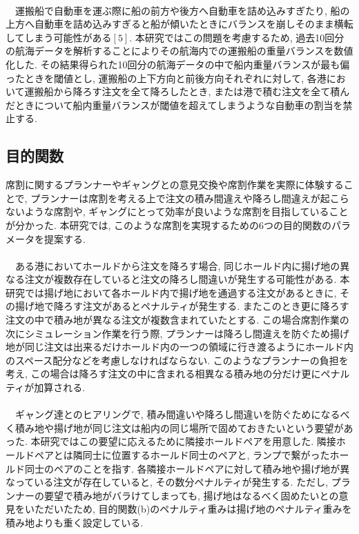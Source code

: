 \documentclass[a4j,11pt,twocolumn]{jsarticle}
\begin{document}
 \\
　運搬船で自動車を運ぶ際に船の前方や後方へ自動車を詰め込みすぎたり, 船の上方へ自動車を詰め込みすぎると船が傾いたときにバランスを崩しそのまま横転してしまう可能性がある$[5]$. 本研究ではこの問題を考慮するため, 過去10回分の航海データを解析することによりその航海内での運搬船の重量バランスを数値化した. その結果得られた10回分の航海データの中で船内重量バランスが最も偏ったときを閾値とし, 運搬船の上下方向と前後方向それぞれに対して, 各港において運搬船から降ろす注文を全て降ろしたとき, または港で積む注文を全て積んだときについて船内重量バランスが閾値を超えてしまうような自動車の割当を禁止する.

\subsection{目的関数}
席割に関するプランナーやギャングとの意見交換や席割作業を実際に体験することで, プランナーは席割を考える上で注文の積み間違えや降ろし間違えが起こらないような席割や, ギャングにとって効率が良いような席割を目指していることが分かった. 本研究では, このような席割を実現するための6つの目的関数のパラメータを提案する. \\

 \\
　ある港においてホールドから注文を降ろす場合, 同じホールド内に揚げ地の異なる注文が複数存在していると注文の降ろし間違いが発生する可能性がある. 本研究では揚げ地において各ホールド内で揚げ地を通過する注文があるときに, その揚げ地で降ろす注文があるとペナルティが発生する.  またこのとき更に降ろす注文の中で積み地が異なる注文が複数含まれていたとする. この場合席割作業の次にシミュレーション作業を行う際, プランナーは降ろし間違えを防ぐため揚げ地が同じ注文は出来るだけホールド内の一つの領域に行き渡るようにホールド内のスペース配分などを考慮しなければならない. このようなプランナーの負担を考え, この場合は降ろす注文の中に含まれる相異なる積み地の分だけ更にペナルティが加算される. \\


 \\
　ギャング達とのヒアリングで, 積み間違いや降ろし間違いを防ぐためになるべく積み地や揚げ地が同じ注文は船内の同じ場所で固めておきたいという要望があった. 本研究ではこの要望に応えるために隣接ホールドペアを用意した. 隣接ホールドペアとは隣同士に位置するホールド同士のペアと, ランプで繋がったホールド同士のペアのことを指す. 各隣接ホールドペアに対して積み地や揚げ地が異なっている注文が存在していると, その数分ペナルティが発生する. ただし, プランナーの要望で積み地がバラけてしまっても, 揚げ地はなるべく固めたいとの意見をいただいたため, 目的関数(b)のペナルティ重みは揚げ地のペナルティ重みを積み地よりも重く設定している. \\
\end{document}

